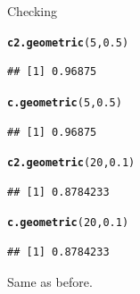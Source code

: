 \documentclass[unknownkeysallowed]{beamer}\usepackage[]{graphicx}\usepackage[]{color}
\makeatletter
\newcommand{\hlnum}[1]{\textcolor[rgb]{0.686,0.059,0.569}{#1}}%
\newcommand{\hlstd}[1]{\textcolor[rgb]{0.345,0.345,0.345}{#1}}%
\newcommand{\hlkwd}[1]{\textcolor[rgb]{0.737,0.353,0.396}{\textbf{#1}}}%
\newenvironment{kframe}{%
 \def\at@end@of@kframe{}%
 \ifinner\ifhmode%
  \def\at@end@of@kframe{\end{minipage}}%
  \begin{minipage}{\columnwidth}%
 \fi\fi%
 \def\FrameCommand##1{\hskip\@totalleftmargin \hskip-\fboxsep
 \colorbox{shadecolor}{##1}\hskip-\fboxsep
     \hskip-\linewidth \hskip-\@totalleftmargin \hskip\columnwidth}%
 \MakeFramed {\advance\hsize-\width
   \@totalleftmargin\z@ \linewidth\hsize
   \@setminipage}}%
 {\par\unskip\endMakeFramed%
 \at@end@of@kframe}
\newenvironment{knitrout}{}{} %
\makeatother
\begin{document}
\begin{frame}[fragile]{Checking}
  
\begin{knitrout}
\color{fgcolor}\begin{kframe}
\begin{alltt}
\hlkwd{c2.geometric}\hlstd{(}\hlnum{5}\hlstd{,}\hlnum{0.5}\hlstd{)}
\end{alltt}
\begin{verbatim}
## [1] 0.96875
\end{verbatim}
\begin{alltt}
\hlkwd{c.geometric}\hlstd{(}\hlnum{5}\hlstd{,}\hlnum{0.5}\hlstd{)}
\end{alltt}
\begin{verbatim}
## [1] 0.96875
\end{verbatim}
\begin{alltt}
\hlkwd{c2.geometric}\hlstd{(}\hlnum{20}\hlstd{,}\hlnum{0.1}\hlstd{)}
\end{alltt}
\begin{verbatim}
## [1] 0.8784233
\end{verbatim}
\begin{alltt}
\hlkwd{c.geometric}\hlstd{(}\hlnum{20}\hlstd{,}\hlnum{0.1}\hlstd{)}
\end{alltt}
\begin{verbatim}
## [1] 0.8784233
\end{verbatim}
\end{kframe}
\end{knitrout}

Same as before.

  
\end{frame}
\end{document}
